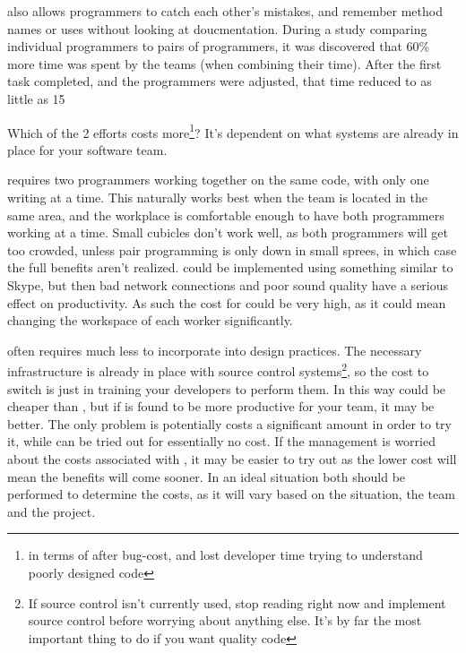 \documentclass{article}
\begin{document}
\PP also allows programmers to catch each other's mistakes, and remember method names or uses without looking at doucmentation. During a study comparing individual programmers to pairs of programmers, it was discovered that 60\% more time was spent by the teams (when combining their time). After the first task completed, and the programmers were adjusted, that time reduced to as little as 15%

Which of the 2 efforts costs more\footnote{in terms of after bug-cost, and lost developer time trying to understand poorly designed code}? It's dependent on what systems are already in place for your software team. 

\PP requires two programmers working together on the same code, with only one writing at a time. This naturally works best when the team is located in the same area, and the workplace is comfortable enough to have both programmers working at a time. Small cubicles don't work well, as both programmers will get too crowded, unless pair programming is only down in small sprees, in which case the full benefits aren't realized. \PP could be implemented using something similar to Skype, but then bad network connections and poor sound quality have a serious effect on productivity. As such the cost for \PP could be very high, as it could mean changing the workspace of each worker significantly.

\CR often requires much less to incorporate into design practices. The necessary infrastructure is already in place with source control systems\footnote{If source control isn't currently used, stop reading right now and implement source control before worrying about anything else. It's by far the most important thing to do if you want quality code}, so the cost to switch is just in training your developers to perform them. In this way \CR could be cheaper than \PP, but if \PP is found to be more productive for your team, it may be better. The only problem is \PP potentially costs a significant amount in order to try it, while \CR can be tried out for essentially no cost. If the management is worried about the costs associated with \PP, it may be easier to try out \CR as the lower cost will mean the benefits will come sooner. In an ideal situation both should be performed to determine the costs, as it will vary based on the situation, the team and the project.
\end{document}
